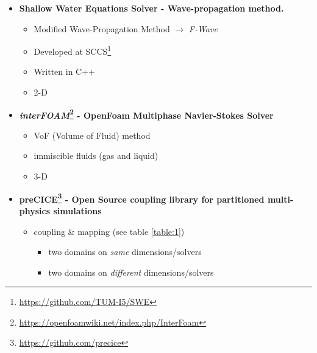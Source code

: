 
\begin{frame}
 	
\begin{multicols}{2}
\begin{itemize}
 \setlength\itemsep{10pt}

\item<2->[]
\textbf{Shallow Water Equations Solver - Wave-propagation method.}
\begin{itemize}
\vspace{5pt}
 \setlength\itemsep{6pt}
\item Modified Wave-Propagation Method $\rightarrow$ \textit{F-Wave} \cite{levequeArticle}
\item Developed at SCCS\footnote{\url{https://github.com/TUM-I5/SWE}}
\item Written in C++
\item 2-D
\end{itemize}

\item<3->[]
\textbf{\textit{interFOAM}\footnote{\url{https://openfoamwiki.net/index.php/InterFoam}} - OpenFoam Multiphase Navier-Stokes Solver}
\begin{itemize}
\vspace{5pt}
 \setlength\itemsep{6pt}
\item VoF (Volume of Fluid) method
\item immiscible fluids (gas and liquid)
\item 3-D
\end{itemize}

\vfill\columnbreak
\item<4->[]
\textbf{preCICE\footnote{\url{https://github.com/precice}} - Open Source coupling library for partitioned multi-physics simulations}
\begin{itemize}
\vspace{5pt}
\item coupling \& mapping {\tiny (see table \ref{table:1})}
\begin{itemize}
\item two domains on \textit{same} dimensions/solvers
\item two domains on \textit{different} dimensions/solvers
\end{itemize}
\end{itemize}
\end{itemize}

\end{multicols}

\end{frame}

